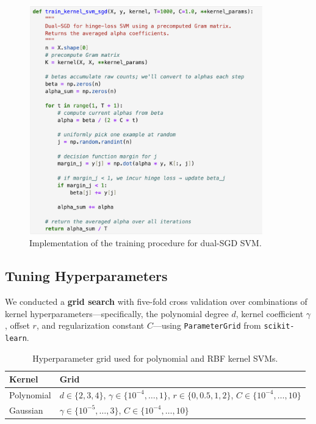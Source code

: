 \documentclass[12pt]{article}
\begin{document}
\begin{figure}[H]
    \centering
    \includegraphics[width=0.9\textwidth]{./kernel-svm-training-procedure.png}
    \caption{Implementation of the training procedure for dual-SGD SVM.}
    \label{fig:kertrain}
\end{figure}

\subsection{Tuning Hyperparameters}

We conducted a \textbf{grid search} with five-fold cross validation over combinations of kernel hyperparameters—specifically, the polynomial degree $d$, kernel coefficient $\gamma$, offset $r$, and regularization constant $C$—using \texttt{ParameterGrid} from \texttt{scikit-learn}.  

\begin{table}[H]
\centering
\begin{tabular}{@{}ll@{}}
\toprule
\textbf{Kernel} & \textbf{Grid} \\ \midrule
Polynomial & $d \in \{2, 3, 4\}$,\; $\gamma \in \{10^{-4},\dots,1\}$,\; $r \in \{0, 0.5, 1, 2\}$,\; $C \in \{10^{-4},\dots,10\}$ \\
Gaussian   & $\gamma \in \{10^{-5},\dots,3\}$,\; $C \in \{10^{-4},\dots,10\}$ \\ 
\bottomrule
\end{tabular}
\caption{Hyperparameter grid used for polynomial and RBF kernel SVMs.}
\label{tab:grid}
\end{table}
\end{document}
